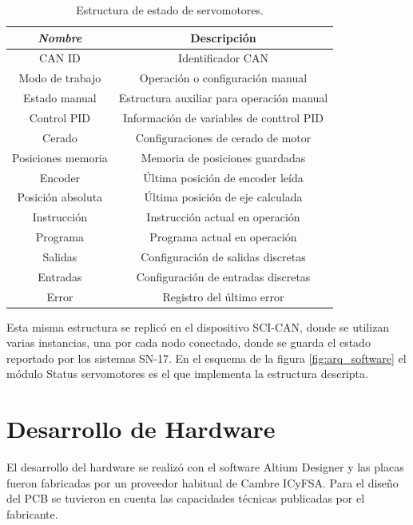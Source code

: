 \begin{table}[h]
	\centering
	\caption[Estructura de estado de servomotores.]{Estructura de estado de servomotores.}
	\begin{tabular}{c c}    
		\toprule
		\textbf{\textit{Nombre}}  & \textbf{Descripción}\\
		\midrule
		CAN ID  			& Identificador CAN							\\		
		Modo de trabajo		& Operación o configuración manual			\\
		Estado manual		& Estructura auxiliar para operación manual \\
		Control PID	 		& Información de variables de conttrol PID	\\
		Cerado				& Configuraciones de cerado de motor 		\\
		Posiciones memoria	& Memoria de posiciones guardadas	 		\\
		Encoder				& Última posición de encoder leída	 		\\
		Posición absoluta	& Última posición de eje calculada	 		\\
		Instrucción			& Instrucción actual en operación	 		\\
		Programa			& Programa actual en operación		 		\\
		Salidas				& Configuración de salidas discretas 		\\
		Entradas			& Configuración de entradas discretas 		\\
		Error				& Registro del último error			 		\\
		\bottomrule
		\hline
	\end{tabular}
	\label{tab:servo_status}
\end{table}

Esta misma estructura se replicó en el dispositivo SCI-CAN, donde se utilizan varias instancias, una por cada nodo conectado, donde se guarda el estado reportado por los sistemas SN-17. En el esquema de la figura \ref{fig:arq_software} el módulo Status servomotores es el que implementa la estructura descripta.

\section{Desarrollo de Hardware}
\label{desarrollo_hw}

El desarrollo del hardware se realizó con el software Altium Designer\citep{web_altium} y las placas fueron fabricadas por un proveedor habitual de Cambre ICyFSA\citep{web_pcbwing}. Para el diseño del PCB se tuvieron en cuenta las capacidades técnicas publicadas por el fabricante\citep{web_pcbwing_capabilities}.


